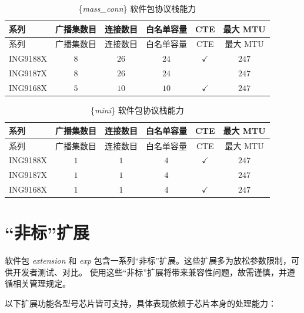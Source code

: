 \documentclass[
  12pt,
]{book}
\begin{document}
\begin{longtable}[]{@{}lccccc@{}}
\caption{\label{tab:ch99-mass-conn-stack-cap} \{\emph{mass\_conn}\} 软件包协议栈能力}\tabularnewline
\toprule()
系列 & 广播集数目 & 连接数目 & 白名单容量 & CTE & 最大 MTU \\
\midrule()
\endfirsthead
\toprule()
系列 & 广播集数目 & 连接数目 & 白名单容量 & CTE & 最大 MTU \\
\midrule()
\endhead
ING9188X & \(8\) & \(26\) & \(24\) & \(\checkmark\) & \(247\) \\
ING9187X & \(8\) & \(26\) & \(24\) & & \(247\) \\
ING9168X & \(5\) & \(10\) & \(10\) & \(\checkmark\) & \(247\) \\
\bottomrule()
\end{longtable}

\begin{longtable}[]{@{}lccccc@{}}
\caption{\label{tab:ch99-mini-stack-cap} \{\emph{mini}\} 软件包协议栈能力}\tabularnewline
\toprule()
系列 & 广播集数目 & 连接数目 & 白名单容量 & CTE & 最大 MTU \\
\midrule()
\endfirsthead
\toprule()
系列 & 广播集数目 & 连接数目 & 白名单容量 & CTE & 最大 MTU \\
\midrule()
\endhead
ING9188X & \(1\) & \(1\) & \(4\) & \(\checkmark\) & \(247\) \\
ING9187X & \(1\) & \(1\) & \(4\) & & \(247\) \\
ING9168X & \(1\) & \(1\) & \(4\) & \(\checkmark\) & \(247\) \\
\bottomrule()
\end{longtable}

\hypertarget{ux975eux6807ux6269ux5c55}{%
\section{``非标''扩展}\label{ux975eux6807ux6269ux5c55}}

软件包 \emph{extension} 和 \emph{exp} 包含一系列``非标''扩展。这些扩展多为放松参数限制，可供开发者测试、对比。
使用这些``非标''扩展将带来兼容性问题，故需谨慎，并遵循相关管理规定。

以下扩展功能各型号芯片皆可支持，具体表现依赖于芯片本身的处理能力：
\end{document}
